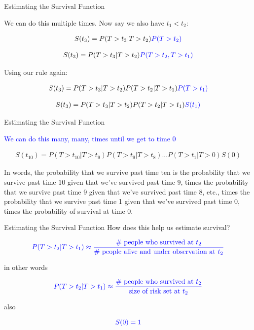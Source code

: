 \documentclass[10pt,t]{beamer}
\begin{document}
\begin{frame}{Estimating the Survival Function}
	
	We can do this multiple times. Now say we also have $t_1<t_2$:
	
	\begin{align*}
	S(t_3)=P(T>t_3|T>t_2)\textcolor{blue}{P(T>t_2)}
	\end{align*}
	
	\begin{align*}
	S(t_3)=P(T>t_3|T>t_2)\textcolor{blue}{P(T>t_2,T>t_1)}
	\end{align*}
	
	
	Using our rule again:
	
	\begin{align*}
	S(t_3)=P(T>t_3|T>t_2)P(T>t_2|T>t_1)\textcolor{blue}{P(T > t_1)}
	\end{align*}
	
	\begin{align*}
	S(t_3)=P(T>t_3|T>t_2)P(T>t_2|T>t_1)\textcolor{blue}{S(t_1)}
	\end{align*}
	
\end{frame}

\begin{frame}{Estimating the Survival Function}
	
	\textcolor{blue}{We can do this many, many, times until we get to time 0}
	
		\begin{align*}
	S(t_{10})=P(T>t_{10}|T>t_9)P(T>t_9|T>t_8)...P(T>t_1|T>0)S(0)
	\end{align*}
	
	\medskip
	
	In words, the probability that we survive past time ten is the probability that we survive past time 10 given that we've survived past time 9, times the probability that we survive past time 9 given that we've survived past time 8, etc., times the probability that we survive past time 1 given that we've survived past time 0, times the probability of survival at time 0.
	
\end{frame}

\begin{frame}{Estimating the Survival Function}
	How does this help us estimate survival?
	

	
	\medskip
	
		\[\textcolor{blue}{P(T>t_{2}|T>t_1)\approx \frac{\text{\# people who survived at }t_2}{\text{\# people alive and under observation at }t_2 }}\]
	
	in other words

	\medskip
	
	\[\textcolor{blue}{P(T>t_{2}|T>t_1)\approx \frac{\text{\# people who survived at }t_2}{\text{size of risk set at }t_2 }}\]
	
	also
	
	\[\textcolor{blue}{S(0)=1}\]
	
	
\end{frame}
\end{document}
